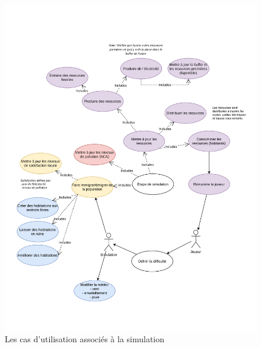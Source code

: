 \documentclass[12pt]{article}
\begin{document}
\begin{figure}[H]
    \includegraphics[width=\textwidth]{uml-usecases-Page-3}
    \caption{Les cas d'utilisation associés à la simulation \label{fig:usecase-simulation}}
\end{figure}
\end{document}
